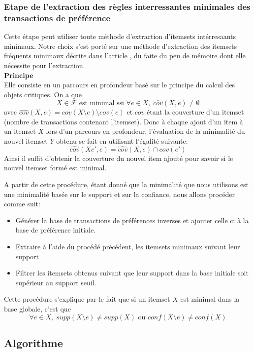 \documentclass[11pt,a4paper]{article}
\theoremstyle{definition}
\begin{document}
	
 
	 
     \subsubsection{Etape de l'extraction des règles interressantes minimales des transactions de préférence}
	Cette étape peut utiliser toute méthode d'extraction d'itemsets intérresaants minimaux. Notre choix s'est porté sur une méthode d'extraction des itemsets fréquents minimaux décrite dans l'article \cite{SOUL}, du faite du peu de mémoire dont elle nécessite pour l'extraction.\\
	\textbf{Principe}\\
	Elle consiste en un parcours en profondeur basé sur le principe du calcul des objets critiques. On a que
	\[
		X\in \mathcal{F}\text{ est minimal ssi }\forall e \in X,\; \widehat{cov}(X,e)\neq \emptyset
	\]
	avec $\widehat{cov}(X,e)=cov(X\setminus e)\setminus cov(e)$ et $cov$ étant la couverture d'un itemset (nombre de transactions contenant l'itemset). Donc à chaque ajout d'un item à un itemset $X$ lors d'un parcours en profondeur, l'évaluation de la minimalité du nouvel itemset $Y$ obtenu se fait en utilisant l'égalité suivante:
	\[
		 	\widehat{cov}(Xe',e)=\widehat{cov}(X,e)\cap cov(e')
	\]
	Ainsi il suffit d'obtenir la couverture du nouvel item ajouté pour savoir si le nouvel itemset formé est minimal.
	
	A partir de cette procédure, étant donné que la minimalité que nous utilisons est une minimalité basée sur le support et sur la confiance, nous allons procéder comme suit:
	\begin{itemize}
	 \item Générer la base de transactions de préférences inverses et ajouter celle ci à la base de préférence initiale.
	 \item Extraire à l'aide du procédé précédent, les itemsets minimaux suivant leur support
	 \item Filtrer les itemsets obtenus suivant que leur support dans la base initiale soit supérieur au support seuil. 
	\end{itemize}
		
		Cette procédure s'explique par le fait que si un itemset $X$ est minimal dans la base globale, c'est que 
		\[
		\forall e\in X,\; supp(X\setminus e)\neq supp(X)\text{ ou }conf(X\setminus e)\neq conf(X)
		\]
   
   
   
   \subsection{Algorithme}
   
\end{document}
